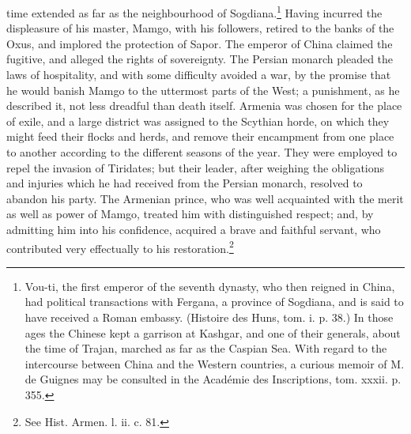 time extended as far as the neighbourhood of Sogdiana.\footnote{Vou-ti, the first emperor of the seventh dynasty, who then reigned in China, had political transactions with Fergana, a province of Sogdiana, and is said to have received a Roman embassy. (Histoire des Huns, tom. i. p. 38.) In those ages the Chinese kept a garrison at Kashgar, and one of their generals, about the time of Trajan, marched as far as the Caspian Sea. With regard to the intercourse between China and the Western countries, a curious memoir of M. de Guignes may be consulted in the Académie des Inscriptions, tom. xxxii. p. 355.} Having incurred the displeasure of his master, Mamgo, with his followers, retired to the banks of the Oxus, and implored the protection of Sapor. The emperor of China claimed the fugitive, and alleged the rights of sovereignty. The Persian monarch pleaded the laws of hospitality, and with some difficulty avoided a war, by the promise that he would banish Mamgo to the uttermost parts of the West; a punishment, as he described it, not less dreadful than death itself. Armenia was chosen for the place of exile, and a large district was assigned to the Scythian horde, on which they might feed their flocks and herds, and remove their encampment from one place to another according to the different seasons of the year. They were employed to repel the invasion of Tiridates; but their leader, after weighing the obligations and injuries which he had received from the Persian monarch, resolved to abandon his party. The Armenian prince, who was well acquainted with the merit as well as power of Mamgo, treated him with distinguished respect; and, by admitting him into his confidence, acquired a brave and faithful servant, who contributed very effectually to his restoration.\footnote{See Hist. Armen. l. ii. c. 81.}

